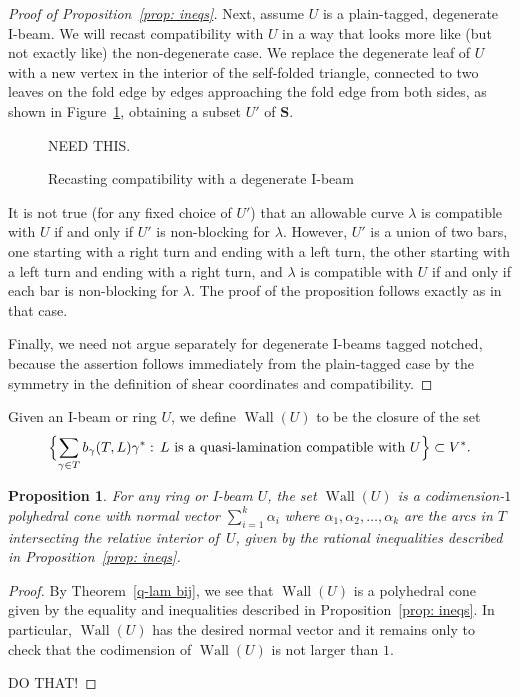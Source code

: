 \documentclass{amsart}
\newtheorem{prop}[proposition]{Proposition}
\theoremstyle{definition}
\theoremstyle{remark}
\numberwithin{equation}{section}
\newcommand{\settt}[1]{{\Bigl\lbrace #1 \Bigr\rbrace}}
\newcommand{\0}{{\mathbf{0}}}
\renewcommand{\S}{\mathbf{S}}
\newcommand{\Wall}{\operatorname{Wall}}
\begin{document}
\begin{proof}[Proof of Proposition~\ref{prop: ineqs}]
Next, assume $U$ is a plain-tagged, degenerate I-beam.
We will recast compatibility with $U$ in a way that looks more like (but not exactly like) the non-degenerate case.
We replace the degenerate leaf of $U$ with a new vertex in the interior of the self-folded triangle, connected to two leaves on the fold edge by edges approaching the fold edge from both sides, as shown in Figure~\ref{degen recast}, obtaining a subset $U'$ of $\S$.
\begin{figure}
NEED THIS.
\caption{Recasting compatibility with a degenerate I-beam}
\label{degen recast}
\end{figure}
It is not true (for any fixed choice of $U'$) that an allowable curve $\lambda$ is compatible with $U$ if and only if $U'$ is non-blocking for $\lambda$.
However, $U'$ is a union of two bars, one starting with a right turn and ending with a left turn, the other starting with a left turn and ending with a right turn, and $\lambda$ is compatible with $U$ if and only if each bar is non-blocking for $\lambda$.
The proof of the proposition follows exactly as in that case.

Finally, we need not argue separately for degenerate I-beams tagged notched, because the assertion follows immediately from the plain-tagged case by the symmetry in the definition of shear coordinates and compatibility.
\end{proof}

Given an I-beam or ring $U$, we define $\Wall(U)$ to be the closure of the set
\[\settt{\sum_{\gamma\in T}b_\gamma(T,L)\gamma^*:\,L\text{ is a quasi-lamination compatible with }U}\subset V^*.\]

\begin{prop}\label{wall dim}
For any ring or I-beam $U$, the set $\Wall(U)$ is a codimension-$1$ polyhedral cone with normal vector $\sum_{i=1}^k\alpha_i$ where $\alpha_1, \alpha_2,\ldots,\alpha_k$ are the arcs in $T$ intersecting the relative interior of~$U$, given by the rational inequalities described in Proposition~\ref{prop: ineqs}.
\end{prop}
\begin{proof}
By Theorem~\ref{q-lam bij}, we see that $\Wall(U)$ is a polyhedral cone given by the equality and inequalities described in Proposition~\ref{prop: ineqs}.
In particular, $\Wall(U)$ has the desired normal vector and it remains only to check that the codimension of $\Wall(U)$ is not larger than $1$.

DO THAT!


\end{proof}
\end{document}
